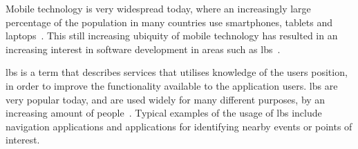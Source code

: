 Mobile technology is very widespread today, where an increasingly large percentage of the population in many countries use smartphones, tablets and laptops~\cite{techcrunch_mobile_usage}. This still increasing ubiquity of mobile technology has resulted in an increasing interest in software development in areas such as \gls{lbs}~\cite{dey2010location}. 

\gls{lbs} is a term that describes services that utilises knowledge of the users position, in order to improve the functionality available to the application users. \gls{lbs} are very popular today, and are used widely for many different purposes, by an increasing amount of people~\cite[pp. 1-2]{schiller2004location}. Typical examples of the usage of \gls{lbs} include navigation applications and applications for identifying nearby events or points of interest.
